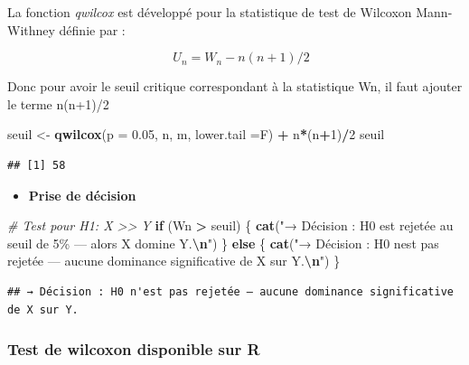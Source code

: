 \documentclass[
  12pt,
]{article}
\newenvironment{Shaded}{\begin{snugshade}}{\end{snugshade}}
\newcommand{\AttributeTok}[1]{\textcolor[rgb]{0.13,0.29,0.53}{#1}}
\newcommand{\CommentTok}[1]{\textcolor[rgb]{0.56,0.35,0.01}{\textit{#1}}}
\newcommand{\ControlFlowTok}[1]{\textcolor[rgb]{0.13,0.29,0.53}{\textbf{#1}}}
\newcommand{\DecValTok}[1]{\textcolor[rgb]{0.00,0.00,0.81}{#1}}
\newcommand{\FloatTok}[1]{\textcolor[rgb]{0.00,0.00,0.81}{#1}}
\newcommand{\FunctionTok}[1]{\textcolor[rgb]{0.13,0.29,0.53}{\textbf{#1}}}
\newcommand{\NormalTok}[1]{#1}
\newcommand{\OtherTok}[1]{\textcolor[rgb]{0.56,0.35,0.01}{#1}}
\newcommand{\SpecialCharTok}[1]{\textcolor[rgb]{0.81,0.36,0.00}{\textbf{#1}}}
\newcommand{\StringTok}[1]{\textcolor[rgb]{0.31,0.60,0.02}{#1}}
\providecommand{\tightlist}{%
  \setlength{\itemsep}{0pt}\setlength{\parskip}{0pt}}
\begin{document}
La fonction \emph{qwilcox} est développé pour la statistique de test de
Wilcoxon Mann-Withney définie par :

\[
\quad U_n = W_n - n(n+1)/2
\]

Donc pour avoir le seuil critique correspondant à la statistique Wn, il
faut ajouter le terme n(n+1)/2

\begin{Shaded}
\begin{Highlighting}[]
\NormalTok{seuil }\OtherTok{\textless{}{-}} \FunctionTok{qwilcox}\NormalTok{(}\AttributeTok{p =} \FloatTok{0.05}\NormalTok{, n, m, }\AttributeTok{lower.tail =}\NormalTok{F) }\SpecialCharTok{+}\NormalTok{ n}\SpecialCharTok{*}\NormalTok{(n}\SpecialCharTok{+}\DecValTok{1}\NormalTok{)}\SpecialCharTok{/}\DecValTok{2}
\NormalTok{seuil}
\end{Highlighting}
\end{Shaded}

\begin{verbatim}
## [1] 58
\end{verbatim}

\begin{itemize}
\tightlist
\item
  \textbf{Prise de décision}
\end{itemize}

\begin{Shaded}
\begin{Highlighting}[]
\CommentTok{\# Test pour H1: X \textgreater{}\textgreater{} Y}
\ControlFlowTok{if}\NormalTok{ (Wn }\SpecialCharTok{\textgreater{}}\NormalTok{ seuil) \{}
  \FunctionTok{cat}\NormalTok{(}\StringTok{"→ Décision : H0 est rejetée au seuil de 5\% — alors X  domine Y.}\SpecialCharTok{\textbackslash{}n}\StringTok{"}\NormalTok{)}
\NormalTok{\} }\ControlFlowTok{else}\NormalTok{ \{}
  \FunctionTok{cat}\NormalTok{(}\StringTok{"→ Décision : H0 n\textquotesingle{}est pas rejetée — aucune dominance significative de X sur Y.}\SpecialCharTok{\textbackslash{}n}\StringTok{"}\NormalTok{)}
\NormalTok{\}}
\end{Highlighting}
\end{Shaded}

\begin{verbatim}
## → Décision : H0 n'est pas rejetée — aucune dominance significative de X sur Y.
\end{verbatim}

\subsubsection{Test de wilcoxon disponible sur
R}\label{test-de-wilcoxon-disponible-sur-r}
\end{document}
